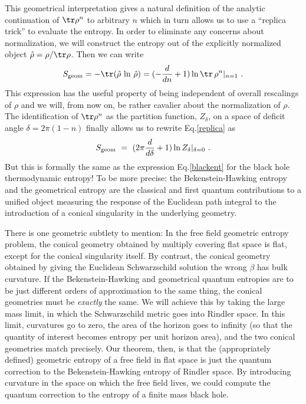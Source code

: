 \documentclass[12pt]{article}
\begin{document}
This geometrical interpretation gives a natural definition of the analytic
continuation of $\tr\rho^n$ to arbitrary $n$ which in turn allows us to
use
a ``replica trick'' to evaluate the entropy. In order to eliminate any concerns
about normalization, we will construct the entropy out of the explicitly
normalized object $\hat\rho = \rho/\tr\rho$. Then we can write
\begin{equation}
S_{\rm geom} = -\tr(\hat\rho\, \ln\, \hat\rho) =
(-{d\over dn} + 1) \ln \tr\,\rho^n |_{n=1}~.
\label{replica}
\end{equation}
This expression has the useful property of being independent of overall
rescalings of $\rho$ and we will, from now on, be rather cavalier about the
normalization of $\rho$. The identification of $\tr\rho^n$ as the
partition
function, $Z_\delta$, on a space of deficit angle $\delta=2\pi(1-n)$ finally
allows us to rewrite Eq.\ref{replica} as
\begin{equation}
S_{\rm geom}~=~(2\pi{d\over d\delta} +1) \ln Z_\delta |_{\delta=0}~.
\label{reptodef}
\end{equation}
But this is formally the same as the expression Eq.\ref{blackent} for the black
hole thermodynamic entropy! To be more precise:  the Bekenstein-Hawking
entropy and the geometrical entropy are the classical and first
quantum contributions to a unified object measuring the response of the
Euclidean path integral to the introduction of a conical singularity in the
underlying geometry.

There is one geometric subtlety to mention: In the free field geometric entropy
problem, the conical geometry obtained by multiply covering flat space is
flat, except for the conical singularity itself.
By contrast, the conical geometry obtained by giving the Euclidean
Schwarzschild solution the wrong $\beta$ has bulk curvature. If the
Bekenstein-Hawking and geometrical quantum entropies are to be just different
orders of approximation to the same thing, the conical geometries must be
{\it exactly} the same. We will achieve this by taking the large mass limit,
in which the Schwarzschild metric goes into Rindler space. In this limit,
curvatures go to zero, the area of the horizon goes to infinity (so that the
quantity of interest becomes entropy per unit horizon area), and the two
conical geometries match precisely. Our theorem, then, is that the
(appropriately defined) geometric entropy of a free field in flat space is just
the quantum correction to the Bekenstein-Hawking entropy of Rindler space.
By introducing curvature in the space on which the free field lives, we could
compute the quantum correction to the entropy of a finite mass black hole.
\end{document}

